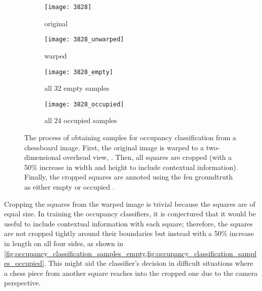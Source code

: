 \documentclass[../main.tex]{subfiles}
\begin{document}
\begin{figure}
    \centering
    \begin{subfigure}[b]{0.47\textwidth}
        \centering
        \texttt{[image: 3828]}
        \caption{original}
        \label{fig:occupancy_classification_samples_original}
    \end{subfigure}
    \hfill
    \begin{subfigure}[b]{0.47\textwidth}
        \centering
        \texttt{[image: 3828\_unwarped]}
        \caption{warped}
        \label{fig:occupancy_classification_samples_warped}
    \end{subfigure}
    
    \bigskip
    \begin{subfigure}[b]{0.47\textwidth}
        \centering
        \texttt{[image: 3828\_empty]}
        \caption{all 32 empty samples}
        \label{fig:occupancy_classification_samples_empty}
    \end{subfigure}
    \hfill
    \begin{subfigure}[b]{0.47\textwidth}
        \centering
        \texttt{[image: 3828\_occupied]}
        \caption{all 24 occupied samples}
        \label{fig:occupancy_classification_samples_occupied}
    \end{subfigure}
    \caption[The process of obtaining samples for occupancy classification from a chessboard image.]{The process of obtaining samples for occupancy classification from a chessboard image. First, the original image  is warped to a two-dimensional overhead view, . Then, all squares are cropped (with a 50\% increase in width and height to include contextual information). Finally, the cropped squares are annoted using the \gls{fen} groundtruth as either empty  or occupied .}
    \label{fig:occupancy_classification_samples}
\end{figure}

Cropping the squares from the warped image is trivial because the squares are of equal size.
In training the occupancy classifiers, it is conjectured that it would be useful to include contextual information with each square; therefore, the squares are not cropped tightly around their boundaries but instead with a 50\% increase in length on all four sides, as shown in \cref{fig:occupancy_classification_samples_empty,fig:occupancy_classification_samples_occupied}.
This might aid the classifier's decision in difficult situations where a chess piece from another square reaches into the cropped one due to the camera perspective.
\end{document}

